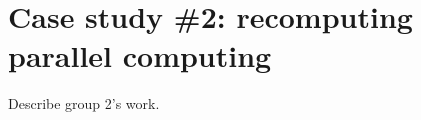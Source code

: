 \section{Case study \#2: recomputing parallel computing}
\label{s:group2}

Describe group 2's work.
